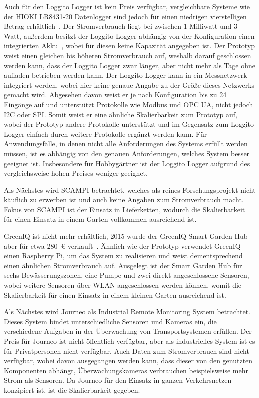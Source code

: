 Auch für den Loggito Logger ist kein Preis verfügbar, vergleichbare Systeme wie der HIOKI LR8431-20 Datenlogger sind jedoch für einen niedrigen vierstelligen Betrag erhältlich~\cite{Hioki}.
Der Stromverbrauch liegt bei zwischen 1 Milliwatt und 3 Watt, außerdem besitzt der Loggito Logger abhängig von der Konfiguration einen integrierten Akku~\cite{LoggitoStrom}, wobei für diesen keine Kapazität angegeben ist.
Der Prototyp weist einen gleichen bis höheren Stromverbrauch auf, weshalb darauf geschlossen werden kann, dass der Loggito Logger zwar länger, aber nicht mehr als Tage ohne aufladen betrieben werden kann.
Der Loggito Logger kann in ein Messnetzwerk integriert werden, wobei hier keine genaue Angabe zu der Größe dieses Netzwerks gemacht wird.
Abgesehen davon weist er je nach Konfiguration bis zu 24 Eingänge auf und unterstützt Protokolle wie Modbus und OPC UA, nicht jedoch I2C oder SPI.
Somit weist er eine ähnliche Skalierbarkeit zum Prototyp auf, wobei der Prototyp andere Protokolle unterstützt und im Gegensatz zum Loggito Logger einfach durch weitere Protokolle ergänzt werden kann.
Für Anwendungsfälle, in denen nicht alle Anforderungen des Systems erfüllt werden müssen, ist es abhängig von den genauen Anforderungen, welches System besser geeignet ist.
Insbesondere für Hobbygärtner ist der Loggito Logger aufgrund des vergleichsweise hohen Preises weniger geeignet.

Als Nächstes wird SCAMPI betrachtet, welches als reines Forschungsprojekt nicht käuflich zu erwerben ist und auch keine Angaben zum Stromverbrauch macht.
Fokus von SCAMPI ist der Einsatz in Lieferketten, wodurch die Skalierbarkeit für einen Einsatz in einem Garten vollkommen ausreichend ist.

GreenIQ ist nicht mehr erhältlich, 2015 wurde der GreenIQ Smart Garden Hub aber für etwa 280~€ verkauft~\cite{GreenIQPreis}.
Ähnlich wie der Prototyp verwendet GreenIQ einen Raspberry Pi, um das System zu realisieren und weist dementsprechend einen ähnlichen Stromverbrauch auf.
Ausgelegt ist der Smart Garden Hub für sechs Bewässerungszonen, eine Pumpe und zwei direkt angeschlossene Sensoren, wobei weitere Sensoren über WLAN angeschlossen werden können, womit die Skalierbarkeit für einen Einsatz in einem kleinen Garten ausreichend ist.

Als Nächstes wird Journeo als Industrial Remote Monitoring System betrachtet.
Dieses System bindet unterschiedliche Sensoren und Kameras ein, die verschiedene Aufgaben in der Überwachung von Transportsystemen erfüllen.
Der Preis für Journeo ist nicht öffentlich verfügbar, aber als industrielles System ist es für Privatpersonen nicht verfügbar.
Auch Daten zum Stromverbrauch sind nicht verfügbar, wobei davon ausgegangen werden kann, dass dieser von den genutzten Komponenten abhängt, Überwachungskameras verbrauchen beispielsweise mehr Strom als Sensoren.
Da Journeo für den Einsatz in ganzen Verkehrsnetzen konzipiert ist, ist die Skalierbarkeit gegeben.


